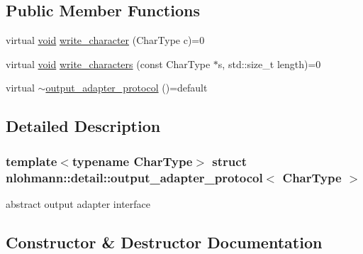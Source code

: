 \subsection*{Public Member Functions}
\begin{DoxyCompactItemize}
\item 
virtual \hyperlink{namespacenlohmann_1_1detail_a59fca69799f6b9e366710cb9043aa77d}{void} \hyperlink{structnlohmann_1_1detail_1_1output__adapter__protocol_a3381896fe1be557f591de2e917cdc7d5}{write\+\_\+character} (Char\+Type c)=0
\item 
virtual \hyperlink{namespacenlohmann_1_1detail_a59fca69799f6b9e366710cb9043aa77d}{void} \hyperlink{structnlohmann_1_1detail_1_1output__adapter__protocol_a2f410a164e0eda17cf6561114b0eee4a}{write\+\_\+characters} (const Char\+Type $\ast$s, std\+::size\+\_\+t length)=0
\item 
virtual \hyperlink{structnlohmann_1_1detail_1_1output__adapter__protocol_ad71cdc057030f8a775a191face25061a}{$\sim$output\+\_\+adapter\+\_\+protocol} ()=default
\end{DoxyCompactItemize}


\subsection{Detailed Description}
\subsubsection*{template$<$typename Char\+Type$>$\newline
struct nlohmann\+::detail\+::output\+\_\+adapter\+\_\+protocol$<$ Char\+Type $>$}

abstract output adapter interface 

\subsection{Constructor \& Destructor Documentation}
\mbox{\label{structnlohmann_1_1detail_1_1output__adapter__protocol_ad71cdc057030f8a775a191face25061a}} 

